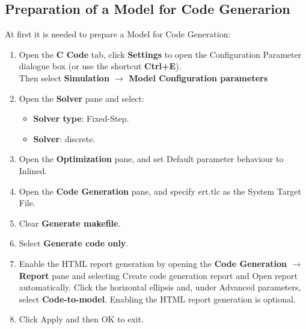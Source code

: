 \documentclass[12pt,a4paper]{report}
\begin{document}
\subsection{Preparation of a Model for Code Generarion}
At first it is needed to prepare a Model for Code Generation:
\begin{enumerate}
	\item Open the \textbf{C Code} tab, click \textbf{Settings} to open the Configuration Parameter dialogue box (or use the shortcut \textbf{Ctrl+E}).\\
	Then select \textbf{Simulation $\to$ Model Configuration parameters}
	\item Open the \textbf{Solver} pane and select:
	\begin{itemize}
		\item \textbf{Solver type}: Fixed-Step.
		\item  \textbf{Solver}: discrete.
	\end{itemize}
	\item Open the \textbf{Optimization} pane, and set Default parameter behaviour to Inlined.
	\item Open the \textbf{Code Generation} pane, and specify ert.tlc as the System Target File.
	\item Clear \textbf{Generate makefile}.
	\item Select \textbf{Generate code only}.
	\item Enable the HTML report generation by opening the \textbf{Code Generation $\to$ Report} pane and selecting Create code generation report and Open report automatically. Click the horizontal ellipsis and, under Advanced parameters, select \textbf{Code-to-model}. Enabling the HTML report generation is optional.
	\item Click Apply and then OK to exit.
\end{enumerate}
\end{document}
